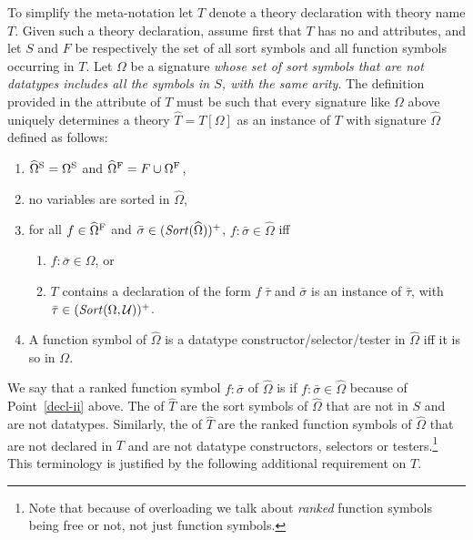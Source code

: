 To simplify the meta-notation let $T$ denote 
a theory declaration with theory name $T$.
Given such a theory declaration,
assume first that $T$ has no  and
 attributes,
and
let $S$ and $F$ be respectively the set of all sort symbols and 
all function symbols occurring in $T$.
Let $\Omega$ be a signature
\emph{whose set of sort symbols that are not datatypes
includes all the symbols in $S$, with the same arity}.
The definition provided in the  attribute of $T$
must be such that
every signature like $\Omega$ above uniquely determines 
a theory $\widehat T = T[\Omega]$ as an instance of $T$
with signature $\widehat\Omega$ defined as follows:
\begin{enumerate}
\item
$\widehat\Omega^\mathrm{S} = \Omega^\mathrm{S}$
and
$\widehat\Omega^\mathrm{F} = F \cup \Omega^\mathrm{F}$,

\item
no variables are sorted in $\widehat\Omega$,

\item
for all $f \in \widehat\Omega^\mathrm{F}$ and 
$\bar{\sigma} \in (\mathit{Sort}(\widehat\Omega))^+$, 
$f{:}\bar{\sigma} \in \widehat\Omega$ iff
\begin{enumerate}
\item
$f{:}\bar{\sigma} \in \Omega$, or

\item \label{decl-ii}
$T$ contains a declaration of the form $f\;\bar{\tau}$ and
$\bar{\sigma}$ is an instance of $\bar \tau$, with $\bar\tau\in (\mathit{Sort}(\Omega, \mathcal{U}))^+$.
\end{enumerate}

\item
A function symbol of $\widehat\Omega$ is a datatype constructor/selector/tester 
in $\widehat\Omega$ iff it is so in $\Omega$.
\end{enumerate}

We say that a ranked function symbol $f{:}\bar{\sigma}$ of $\widehat\Omega$ 
is  
if $f{:}\bar{\sigma} \in \widehat\Omega$
because of Point~\ref{decl-ii} above.
The  of $\widehat T$ are
the sort symbols of $\widehat\Omega$ that are not in $S$
and are not datatypes.
Similarly, the  of $\widehat T$
are the ranked function symbols of $\widehat\Omega$
that are not declared in $T$
and are not datatype constructors, selectors or testers.\footnote{%
Note that because of overloading 
we talk about \emph{ranked} function symbols being free or not,
not just function symbols.
}
This terminology is justified by the following additional requirement on $T$.

